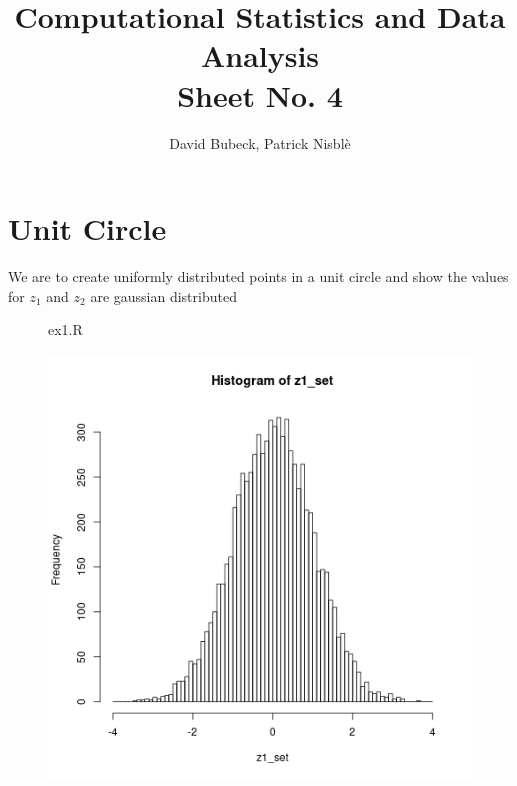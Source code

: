 \documentclass[11pt, a4paper, reqno]{scrartcl}
\begin{document}
    \title{Computational Statistics and Data Analysis\\Sheet No. 4}
    \author{David Bubeck, Patrick Nisbl\`e}
    \maketitle


    \section{Unit Circle}
        We are to create uniformly distributed points in a unit circle and show the values for $z_1$ and $z_2$ are gaussian distributed
        
        \begin{figure}[H]
            
            \caption{ex1.R}
        \end{figure}
    
        \begin{figure}[H]
            \includegraphics[width=.7\paperwidth]{ex1.png}
        \end{figure}
        
        
\end{document}
